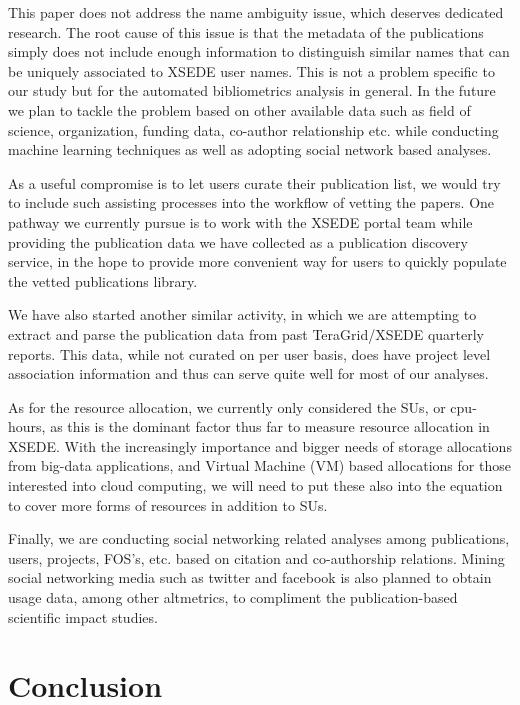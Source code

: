 \documentclass{sig-alternate}
\begin{document}
This paper does not address the name ambiguity issue, which deserves
dedicated research. The root cause of this issue is that the metadata of
the publications simply does not include enough information to
distinguish similar names that can be uniquely associated to XSEDE
user names. This is not a problem specific to our study but for the
automated bibliometrics analysis in general. In the future we plan to
tackle the problem based on other available data such as field of
science, organization, funding data, co-author relationship etc. while
conducting machine learning techniques as well as adopting social
network based analyses.

As a useful compromise is to let users curate their publication
list, we would try to include such assisting processes into the
workflow of vetting the papers. One pathway we currently pursue
is to work with the XSEDE portal team while providing the publication
data we have collected as a publication discovery service, in the hope
to provide more convenient way for users to quickly populate the
vetted publications library.

We have also started another similar activity, in which we are
attempting to extract and parse the publication data from past
TeraGrid/XSEDE quarterly reports. This data, while not curated on per
user basis, does have project level association information and thus
can serve quite well for most of our analyses.

As for the resource allocation, we currently only considered the SUs,
or cpu-hours, as this is the dominant factor thus far to measure
resource allocation in XSEDE. With the increasingly importance and
bigger needs of storage allocations from big-data applications, and
Virtual Machine (VM) based allocations for those interested into cloud
computing, we will need to put these also into the equation to cover
more forms of resources in addition to SUs.

Finally, we are conducting social networking related analyses among
publications, users, projects, FOS's, etc. based on citation and
co-authorship relations. Mining social networking media such as
twitter and facebook is also planned to obtain usage data, among other
altmetrics, to compliment the publication-based scientific impact
studies.

\section{Conclusion} \label{S:conclusion}
\end{document}
